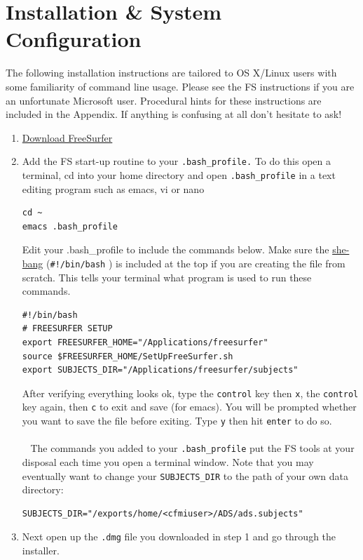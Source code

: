 \documentclass[paper=a4, fontsize=11pt]{scrartcl} %
\numberwithin{equation}{section} %
\numberwithin{figure}{section} %
\numberwithin{table}{section} %
\begin{document}
\section{Installation \& System Configuration}
The following installation instructions are tailored to OS X/Linux users with some familiarity of command line usage.  Please see the FS instructions if you are an unfortunate Microsoft user. Procedural hints for these instructions are included in the Appendix.  If anything is confusing at all don't hesitate to ask!
\begin{enumerate}
\item \href{ftp://surfer.nmr.mgh.harvard.edu/pub/dist/freesurfer/5.3.0/freesurfer-Darwin-lion-stable-pub-v5.3.0.dmg}{Download FreeSurfer}
\item Add the FS start-up routine to your \texttt{.bash\_profile.}  To do this open a terminal, cd into your home directory and open \texttt{.bash\_profile} in a text editing program such as emacs, vi or nano
\begin{lstlisting}[frame=single]
cd ~
emacs .bash_profile
\end{lstlisting}
Edit your .bash\_profile to include the commands below.  Make sure the  \href{https://en.wikipedia.org/wiki/Shebang_(Unix)}{she-bang} (\texttt{\#!/bin/bash} ) is included at the top if you are creating the file from scratch.  This tells your terminal what program is used to run these commands.  
\begin{lstlisting}[frame=single]
#!/bin/bash
# FREESURFER SETUP
export FREESURFER_HOME="/Applications/freesurfer"
source $FREESURFER_HOME/SetUpFreeSurfer.sh
export SUBJECTS_DIR="/Applications/freesurfer/subjects"
\end{lstlisting}
After verifying everything looks ok, type the \texttt{control} key then \texttt{x}, the \texttt{control} key again, then \texttt{c} to exit and save (for emacs). You will be prompted whether you want to save the file before exiting.  Type \texttt{y} then hit \texttt{enter} to do so. 
\\~ \\~
The commands you added to your \texttt{.bash\_profile} put the FS tools at your disposal each time you open a terminal window.  Note that you may eventually want to change your \texttt{SUBJECTS\_DIR} to the path of your own data directory:
\begin{lstlisting}[frame=single]
SUBJECTS_DIR="/exports/home/<cfmiuser>/ADS/ads.subjects"
\end{lstlisting}
\item Next open up the \texttt{.dmg} file you downloaded in step 1 and go through the installer.

\end{enumerate}
\end{document}

